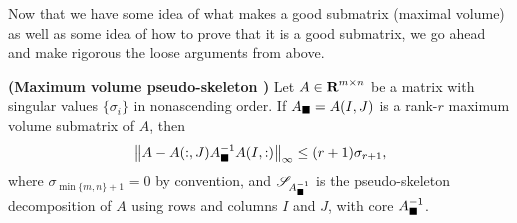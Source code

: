 \documentclass{article}
\begin{document}
	
	
	Now that we have some idea of what makes a good submatrix (maximal volume) as well as some idea of how to prove that it is a good submatrix, we go ahead and make rigorous the loose arguments from above.
	
	\begin{thm} \textnormal{\bf(Maximum volume pseudo-skeleton \cite{olshevsky_2001})}
		\label{thm:maxvol_pseudo-skeleton}
		Let $A \in \textnormal{\bf R}^{m\times n}$ be a matrix with singular values $\{\sigma_i\}$ in nonascending order. If $A_\blacksquare = A(I,J)$ is a rank-$r$ maximum volume submatrix of $A$, then
		\begin{equation}
			\left\lVert A - A(:,J)A_\blacksquare^{-1}A(I,:) \right\rVert_\infty \le (r+1)\sigma_{r+1},
		\end{equation}
		where $\sigma_{\min\{m,n\}+1} = 0$ by convention, and $\mathscr{S}_{A_\blacksquare^{-1}}$ is the pseudo-skeleton decomposition of $A$ using rows and columns $I$ and $J$, with core $A_\blacksquare^{-1}$.
	\end{thm}
	
\end{document}
